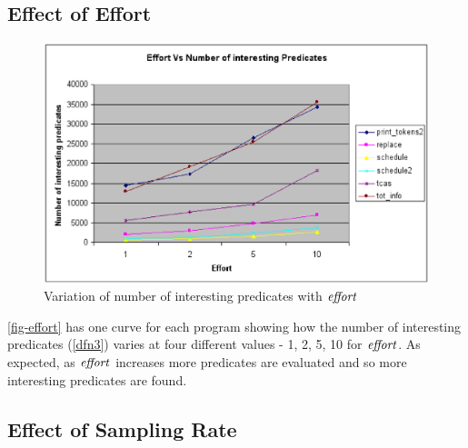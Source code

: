 \subsection{Effect of Effort}

\begin{figure}
  \centering
  \includegraphics{charts/effort}
  \caption{Variation of number of interesting predicates with $\mathit{effort}$}
  \label{fig-effort}
\end{figure}

\autoref{fig-effort} has one curve for each program showing how the number of interesting predicates (\autoref{dfn3}) varies at four different values - 1, 2, 5, 10 for $\mathit{effort}$.  As expected, as $\mathit{effort}$ increases more predicates are evaluated and so more interesting predicates are found.

\subsection{Effect of Sampling Rate}
\label{sec-sampling}

